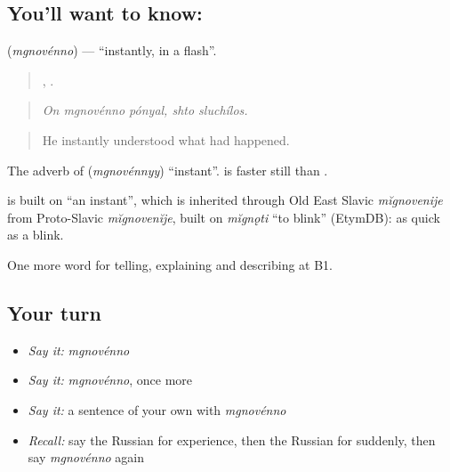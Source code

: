 \subsection*{You'll want to know: }
\textbf{} (\emph{mgnovénno}) — \textquotedblleft{}instantly, in a flash\textquotedblright{}.

\begin{quote}
  ,  .
\end{quote}

\begin{quote}
\emph{On mgnovénno pónyal, shto sluchílos.}
\end{quote}

\begin{quote}
He instantly understood what had happened.
\end{quote}

The adverb of \emph{} (\emph{mgnovénnyy}) \textquotedblleft{}instant\textquotedblright{}. \emph{} is faster still than \emph{}.

\begin{cousinweb}
\emph{} is built on \emph{} \textquotedblleft{}an instant\textquotedblright{}, which is inherited through Old East Slavic \emph{mĭgnovenije} from Proto-Slavic \emph{mĭgnovenĭje}, built on \emph{mĭgnǫti} \textquotedblleft{}to blink\textquotedblright{} (EtymDB): as quick as a blink.
\end{cousinweb}

\begin{grammarlens}[title={What you've built}]
One more word for telling, explaining and describing at B1.
\end{grammarlens}

\subsection*{Your turn}
\begin{itemize}
\raggedright
  \item \emph{Say it:} \emph{mgnovénno}
  \item \emph{Say it:} \emph{mgnovénno}, once more
  \item \emph{Say it:} a sentence of your own with \emph{mgnovénno}
  \item \emph{Recall:} say the Russian for experience, then the Russian for suddenly, then say \emph{mgnovénno} again
\end{itemize}

